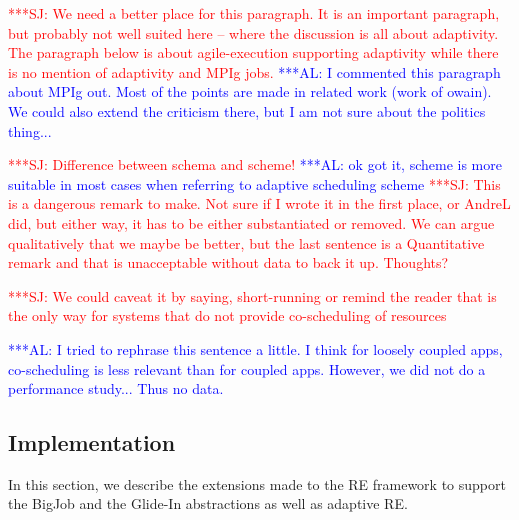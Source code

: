 \documentclass{rspublic}
\newcommand{\alnote}[1]{ {\textcolor{blue} { ***AL: #1 }}}
\newcommand{\jhanote}[1]{ {\textcolor{red} { ***SJ: #1 }}}
\newcommand{\alnote}[1]{}
\newcommand{\jhanote}[1]{}
\begin{document}
\jhanote{We need a better place for this paragraph. It is an important
  paragraph, but probably not well suited here -- where the discussion
  is all about adaptivity. The paragraph below is about
  agile-execution supporting adaptivity while there is no mention of
  adaptivity and MPIg jobs.}
\alnote{I commented this paragraph about MPIg out. Most of the points are
made in related work (work of owain). We could also extend the criticism
there, but I am not sure about the politics thing...}  



\jhanote{Difference between schema and scheme!}
\alnote{ok got it, scheme is more suitable in most cases when referring to adaptive
scheduling scheme}
\jhanote{This is a dangerous remark to
  make. Not sure if I wrote it in the first place, or AndreL did, but
  either way, it has to be either substantiated or removed. We can
  argue qualitatively that we maybe be better, but the last sentence
  is a Quantitative remark and that is unacceptable without data to
  back it up. Thoughts?}

\jhanote{We could caveat it by saying, short-running or remind the
  reader that is the only way for systems that do not provide
  co-scheduling of resources}

\alnote{I tried to rephrase this sentence a little. I think for loosely coupled
apps, co-scheduling is less relevant than for coupled apps. However,
we did not do a performance study... Thus no data.}   
         
\subsection{Implementation}

In this section, we describe the extensions made to the RE framework
to support the BigJob and the Glide-In abstractions as well as adaptive
RE.
\end{document}
